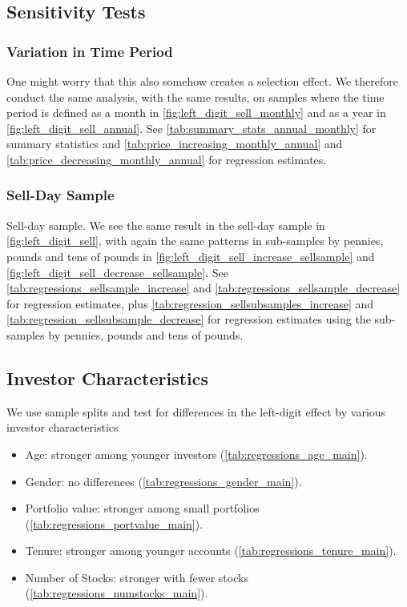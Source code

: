 \subsection{Sensitivity Tests}

\subsubsection{Variation in Time Period}

One might worry that this also somehow creates a selection effect. We therefore conduct the same analysis, with the same results, on samples where the time period is defined as a month in \ref{fig:left_digit_sell_monthly} and as a year in \ref{fig:left_digit_sell_annual}. See \ref{tab:summary_stats_annual_monthly} for summary statistics and \ref{tab:price_increasing_monthly_annual} and \ref{tab:price_decreasing_monthly_annual} for regression estimates.

\subsubsection{Sell-Day Sample}

Sell-day sample. We see the same result in the sell-day sample in \ref{fig:left_digit_sell}, with again the same patterns in sub-samples by pennies, pounds and tens of pounds in \ref{fig:left_digit_sell_increase_sellsample} and \ref{fig:left_digit_sell_decrease_sellsample}. See \ref{tab:regressions_sellsample_increase} and \ref{tab:regressions_sellsample_decrease} for regression estimates, plus \ref{tab:regression_sellsubsamples_increase} and \ref{tab:regression_sellsubsample_decrease} for regression estimates using the sub-samples by pennies, pounds and tens of pounds.

\subsection{Investor Characteristics} 

We use sample splits and test for differences in the left-digit effect by various investor characteristics
\begin{itemize}
	\item Age: stronger among younger investors (\ref{tab:regressions_age_main}).
	\item Gender: no differences (\ref{tab:regressions_gender_main}).
	\item Portfolio value: stronger among small portfolios (\ref{tab:regressions_portvalue_main}).
	\item Tenure: stronger among younger accounts (\ref{tab:regressions_tenure_main}).
	\item Number of Stocks: stronger with fewer stocks (\ref{tab:regressions_numstocks_main}).
\end{itemize}



